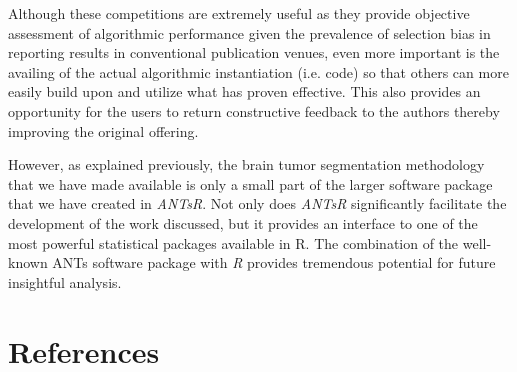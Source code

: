 \documentclass[preprint,authoryear,review,12pt]{elsarticle}
\begin{document}
Although these competitions are extremely useful as they provide objective
assessment of algorithmic performance given the prevalence of selection bias
in reporting results in conventional publication venues, even more important
is the availing of the actual algorithmic instantiation (i.e. code) so that
others can more easily build upon and utilize what has proven effective. 
This also provides an opportunity for the users to return
constructive feedback to the authors thereby improving the original offering.  

However, as explained previously, the brain tumor segmentation 
methodology that we have made available is only a small part of the 
larger software package that we have created in \textit{ANTsR}.  Not only does
\textit{ANTsR} significantly facilitate the development of the work discussed,
but it provides an interface to one of the most powerful statistical
packages available in R.  The combination of the well-known ANTs software
package with \textit{R} provides tremendous potential for future insightful analysis.




\section*{References}



\end{document}
